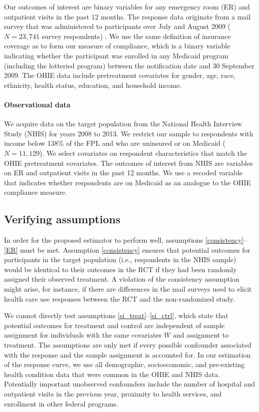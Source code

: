 \documentclass[12pt]{article}
\begin{document}
Our outcomes of interest are binary variables for any emergency room (ER) and outpatient visits in the past 12 months. The response data originate from a mail survey that was administered to participants over July and August 2009 ($N = 23,741$ survey respondents) \cite{finkelstein2012}. We use the same definition of insurance coverage as \citet{finkelstein2012} to form our measure of compliance, which is a binary variable indicating whether the participant was enrolled in any Medicaid program (including the lotteried program) between the notification date and 30 September 2009. The OHIE data include pretreatment covariates for gender, age, race, ethnicity, health status, education, and household income.

\paragraph{Observational data} 

We acquire data on the target population from the National Health Interview Study (NHIS) \cite{NHIS} for years 2008 to 2013.  We restrict our sample to respondents with income below 138\% of the FPL and who are uninsured or on Medicaid ($N=11,129$). We select covariates on respondent characteristics that match the OHIE pretreatment covariates. The outcomes of interest from NHIS are variables on ER and outpatient visits in the past 12 months. We use a recoded variable that indicates whether respondents are on Medicaid as an analogue to the OHIE compliance measure.

\subsection{Verifying assumptions}

In order for the proposed estimator to perform well, assumptions \eqref{consistency}--\eqref{ER} must be met.  Assumption \eqref{consistency} ensures that potential outcomes for participants in the target population (i.e., respondents in the NHIS sample) would be identical to their outcomes in the RCT if they had been randomly assigned their observed treatment. A violation of the consistency assumption might arise, for instance, if there are differences in the mail surveys used to elicit health care use responses between the RCT and the non-randomized study. 
 
We cannot directly test assumptions \eqref{si_treat}--\eqref{si_ctrl}, which state that potential outcomes for treatment and control are independent of sample assignment for individuals with the same covariates $W$ and assignment to treatment.  The assumptions are only met if every possible confounder associated with the response and the sample assignment is accounted for.  In our estimation of the response curve, we use all demographic, socioeconomic, and pre-existing health condition data that were common in the OHIE and NHIS data.  Potentially important unobserved confounders include the number of hospital and outpatient visits in the previous year, proximity to health services, and enrollment in other federal programs. 
\end{document}
